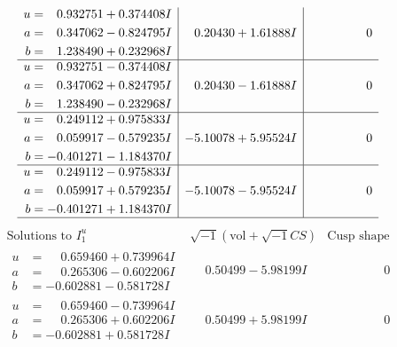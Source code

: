 \documentclass[1p]{elsarticle_modified}
\theoremstyle{definition}
\newcommand{\I}{\sqrt{-1}}
\begin{document}
$$\begin{array}{c|c|c}
\begin{aligned}
u &= \phantom{-}0.932751 + 0.374408 I \\
a &= \phantom{-}0.347062 - 0.824795 I \\
b &= \phantom{-}1.238490 + 0.232968 I\end{aligned}
 & \phantom{-}0.20430 + 1.61888 I & \phantom{-0.000000 } 0 \\ \hline\begin{aligned}
u &= \phantom{-}0.932751 - 0.374408 I \\
a &= \phantom{-}0.347062 + 0.824795 I \\
b &= \phantom{-}1.238490 - 0.232968 I\end{aligned}
 & \phantom{-}0.20430 - 1.61888 I & \phantom{-0.000000 } 0 \\ \hline\begin{aligned}
u &= \phantom{-}0.249112 + 0.975833 I \\
a &= \phantom{-}0.059917 - 0.579235 I \\
b &= -0.401271 - 1.184370 I\end{aligned}
 & -5.10078 + 5.95524 I & \phantom{-0.000000 } 0 \\ \hline\begin{aligned}
u &= \phantom{-}0.249112 - 0.975833 I \\
a &= \phantom{-}0.059917 + 0.579235 I \\
b &= -0.401271 + 1.184370 I\end{aligned}
 & -5.10078 - 5.95524 I & \phantom{-0.000000 } 0\\
 \hline 
 \end{array}$$\newpage$$\begin{array}{c|c|c}  
\text{Solutions to }I^u_{1}& \I (\text{vol} + \sqrt{-1}CS) & \text{Cusp shape}\\
 \hline 
\begin{aligned}
u &= \phantom{-}0.659460 + 0.739964 I \\
a &= \phantom{-}0.265306 - 0.602206 I \\
b &= -0.602881 - 0.581728 I\end{aligned}
 & \phantom{-}0.50499 - 5.98199 I & \phantom{-0.000000 } 0 \\ \hline\begin{aligned}
u &= \phantom{-}0.659460 - 0.739964 I \\
a &= \phantom{-}0.265306 + 0.602206 I \\
b &= -0.602881 + 0.581728 I\end{aligned}
 & \phantom{-}0.50499 + 5.98199 I & \phantom{-0.000000 } 0 \\ \hline\begin{aligned}

\end{aligned}
\end{array}$$
\end{document}
